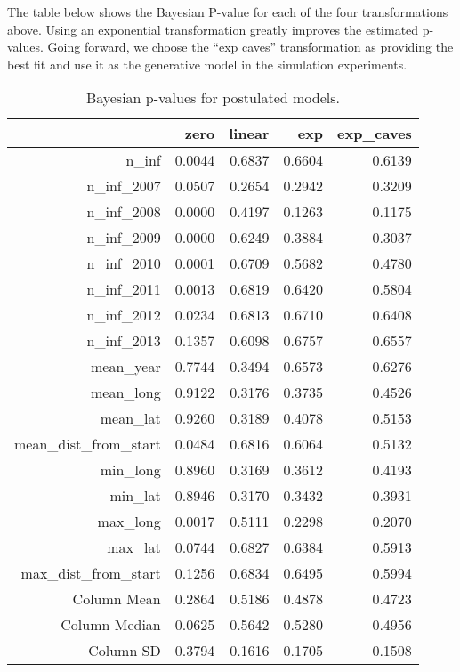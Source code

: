 \documentclass[11pt]{article}
\begin{document}
The table below shows the Bayesian P-value for each of the four
transformations above.  Using an exponential transformation greatly
improves the estimated p-values.  Going forward, we choose the
``exp\(\_\)caves'' transformation as providing the best fit and use
it as the generative model in the simulation experiments.
\begin{table}[ht]
\centering
\begin{tabular}{rrrrr}
  & zero & linear & exp & exp\_caves \\ 
  \hline
n\_inf & 0.0044 & 0.6837 & 0.6604 & 0.6139 \\ 
  n\_inf\_2007 & 0.0507 & 0.2654 & 0.2942 & 0.3209 \\ 
  n\_inf\_2008 & 0.0000 & 0.4197 & 0.1263 & 0.1175 \\ 
  n\_inf\_2009 & 0.0000 & 0.6249 & 0.3884 & 0.3037 \\ 
  n\_inf\_2010 & 0.0001 & 0.6709 & 0.5682 & 0.4780 \\ 
  n\_inf\_2011 & 0.0013 & 0.6819 & 0.6420 & 0.5804 \\ 
  n\_inf\_2012 & 0.0234 & 0.6813 & 0.6710 & 0.6408 \\ 
  n\_inf\_2013 & 0.1357 & 0.6098 & 0.6757 & 0.6557 \\ 
  mean\_year & 0.7744 & 0.3494 & 0.6573 & 0.6276 \\ 
  mean\_long & 0.9122 & 0.3176 & 0.3735 & 0.4526 \\ 
  mean\_lat & 0.9260 & 0.3189 & 0.4078 & 0.5153 \\ 
  mean\_dist\_from\_start & 0.0484 & 0.6816 & 0.6064 & 0.5132 \\ 
  min\_long & 0.8960 & 0.3169 & 0.3612 & 0.4193 \\ 
  min\_lat & 0.8946 & 0.3170 & 0.3432 & 0.3931 \\ 
  max\_long & 0.0017 & 0.5111 & 0.2298 & 0.2070 \\ 
  max\_lat & 0.0744 & 0.6827 & 0.6384 & 0.5913 \\ 
  max\_dist\_from\_start & 0.1256 & 0.6834 & 0.6495 & 0.5994 \\ 
   \hline
Column Mean & 0.2864 & 0.5186 & 0.4878 & 0.4723 \\ 
  Column Median & 0.0625 & 0.5642 & 0.5280 & 0.4956 \\ 
  Column SD & 0.3794 & 0.1616 & 0.1705 & 0.1508 \\ 
   \hline
\end{tabular}
\caption{Bayesian p-values for postulated models.} 
\end{table}
\end{document}
